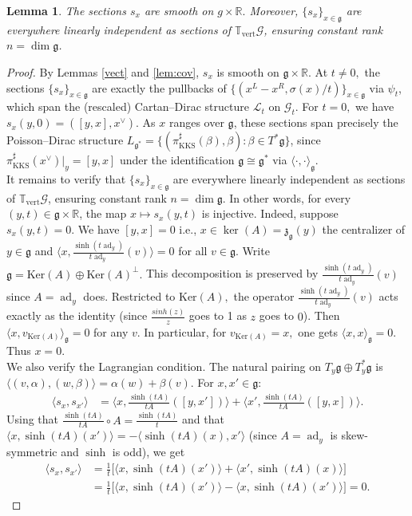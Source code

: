 \documentclass[reqno]{amsart}
\theoremstyle{plain}
\newtheorem{Lem}[Thm]{Lemma}
\theoremstyle{definition}
\newcommand{\R}{\mathbb{R}}
\newcommand{\g}{\mathfrak{g}}
\newcommand{\Ker}{\text{Ker}}
\newcommand{\ad}{\operatorname{ad}}
\begin{document}
\begin{Lem} \label{sections s}
The sections $s_x$ are smooth on $g\times \R.$ Moreover, $\{s_x\}_{x \in \g}$ are everywhere linearly independent as sections of $\mathbb{T}_{\mathrm{vert}}\mathcal{G}$, ensuring constant rank $n = \dim \g$. 
\end{Lem}

\medskip

\begin{proof}

By Lemmas \ref{vect} and \ref{lem:cov}, $s_x$ is smooth on $\g \times \R.$
At $t \neq 0,$ the sections $\{s_x\}_{x \in \g}$ are exactly the pullbacks of $\{(x^L - x^R, \sigma(x)/t)\}_{x \in \g}$ via $\psi_t$, which span the (rescaled) Cartan--Dirac structure $\mathcal{L}_t$ on $\mathcal{G}_t$. For $t = 0,$ we have $s_x(y,0) = ([y,x], x^\vee)$. As $x$ ranges over $\g$, these sections span precisely the Poisson--Dirac structure $L_{\g^*} = \{(\pi_{\mathrm{KKS}}^\sharp(\beta),\beta) : \beta \in T^*\g\}$, since $\pi_{\mathrm{KKS}}^\sharp(x^\vee)\big|_y = [y,x]$ under the identification $\g \cong \g^*$ via $\langle\cdot,\cdot\rangle_\g$.\\
 
 
It remains to verify that $\{s_x\}_{x \in \g}$ are everywhere linearly independent as sections of $\mathbb{T}_{\mathrm{vert}}\mathcal{G}$, ensuring constant rank $n = \dim \g$. In other words, for every $(y,t) \in \g \times \R$, the map $x \mapsto s_x(y,t)$ is injective. Indeed, suppose $s_x(y,t) = 0.$ We have $[y,x] = 0$ i.e., $x \in \ker(A) = \mathfrak{z}_{\g}(y)$ the centralizer of $y\in \g$ and $\langle x, \frac{\sinh(t\ad_y)}{t\ad_y}(v)\rangle = 0$ for all $v \in \g$. Write $\g = \Ker(A)\oplus \Ker(A)^{\perp}.$ This decomposition is preserved by $\frac{\sinh(t\ad_y)}{t\ad_y}(v)$ since $A = \ad_y$ does. Restricted to $\Ker(A),$ the operator $\frac{\sinh(t\ad_y)}{t\ad_y}(v)$ acts exactly as the identity (since $\frac{sinh(z)}{z}$ goes to 1 as $z$ goes to $0$). Then $\langle x,v_{\Ker(A)} \rangle_{\g} = 0$ for any $v.$ In particular, for $v_{\Ker(A)} = x,$ one gets $\langle x,x \rangle_{\g} = 0.$ Thus $x = 0.$\\

 
We also verify the Lagrangian condition. The natural pairing on $T_y\g \oplus T_y^*\g$ is $\langle(v,\alpha),(w,\beta)\rangle = \alpha(w) + \beta(v)$. For $x, x' \in \g$:
\begin{align*}
\langle s_x, s_{x'}\rangle
&= \Big\langle x, \frac{\sinh(tA)}{tA}([y,x'])\Big\rangle + \Big\langle x', \frac{\sinh(tA)}{tA}([y,x])\Big\rangle.
\end{align*}
Using that $\frac{\sinh(tA)}{tA} \circ A = \frac{\sinh(tA)}{t}$ and that $\langle x, \sinh(tA)(x')\rangle = -\langle \sinh(tA)(x), x'\rangle$ (since $A = \ad_y$ is skew-symmetric and $\sinh$ is odd), we get
\begin{align*}
\langle s_x, s_{x'}\rangle
&= \frac{1}{t}\Big[\langle x, \sinh(tA)(x')\rangle + \langle x', \sinh(tA)(x)\rangle\Big] \\
&= \frac{1}{t}\Big[\langle x, \sinh(tA)(x')\rangle - \langle x, \sinh(tA)(x')\rangle\Big] = 0.
\end{align*}


\end{proof}
\end{document}
